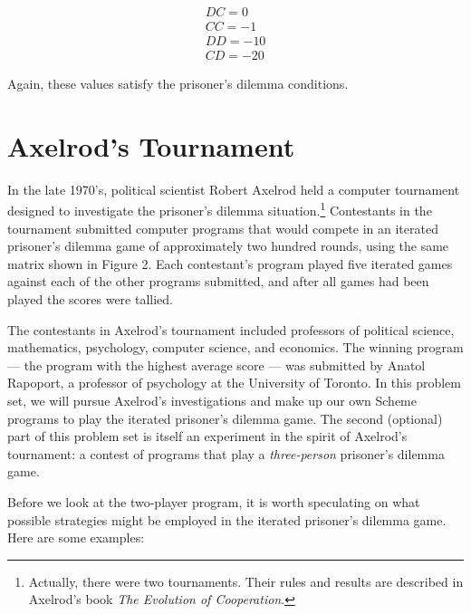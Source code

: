 \begin{eqnarray*}
DC = 0 \\
CC = -1 \\
DD = -10 \\
CD = -20
\end{eqnarray*}


\noindent Again, these values satisfy the prisoner's dilemma conditions.

\section{Axelrod's Tournament}

In the late 1970's, political scientist Robert Axelrod held a computer
tournament designed to investigate the prisoner's dilemma
situation.\footnote{Actually, there were two tournaments. Their rules
and results are described in Axelrod's book {\sl The Evolution of
Cooperation}.} Contestants in the tournament submitted computer
programs that would compete in an iterated prisoner's dilemma game of
approximately two hundred rounds, using the same matrix shown in
Figure 2. Each contestant's program played five iterated games against
each of the other programs submitted, and after all games had been
played the scores were tallied.

The contestants in Axelrod's tournament included professors of
political science, mathematics, psychology, computer science, and
economics. The winning program --- the program with the highest
average score --- was submitted by Anatol Rapoport, a professor of
psychology at the University of Toronto. In this problem set, we will
pursue Axelrod's investigations and make up our own Scheme programs to
play the iterated prisoner's dilemma game. The second (optional) part
of this problem set is itself an experiment in the spirit of Axelrod's
tournament: a contest of programs that play a {\it three-person}
prisoner's dilemma game.

Before we look at the two-player program, it is worth speculating on
what possible strategies might be employed in the iterated prisoner's
dilemma game. Here are some examples:

